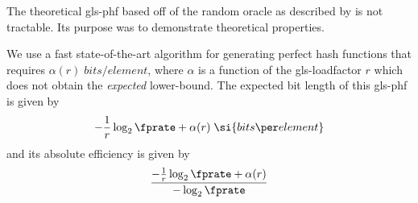 %


The theoretical \gls{gls-phf} based off of the random oracle as described by \cite{oph} is not tractable. Its purpose was to demonstrate theoretical properties.

We use a fast state-of-the-art algorithm \cite{chd} for generating perfect hash functions that requires $\alpha(r) \; \si{bits \per element}$, where $\alpha$ is a function of the \gls{gls-loadfactor} $r$ which does not obtain the \emph{expected} lower-bound. The expected bit length of this \gls{gls-phf} is given by
\begin{equation}
    -\frac{1}{r} \log_2 \fprate + \alpha(r) \; \si{bits \per element}
\end{equation}
and its absolute efficiency is given by
\begin{equation}
    \frac{-\frac{1}{r}\log_2 \fprate + \alpha(r)}{-\log_2 \fprate}
\end{equation}


